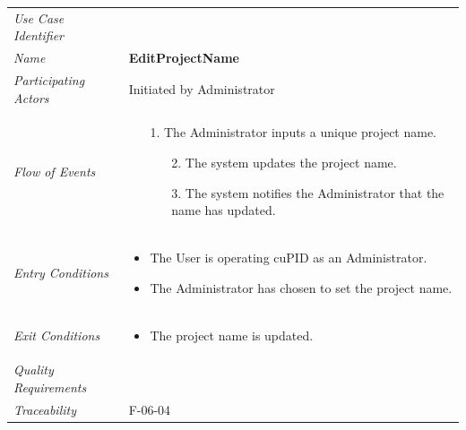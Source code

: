 \documentclass[12pt,letterpaper]{article}
\begin{document}
\begin{center}
	\begin{tabu} to 
		\toprule
		Use Case Identifier & \editprojectname{} \\
		Name & {\bf EditProjectName} \\
		Participating Actors & Initiated by Administrator \\
		Flow of Events & 
		\begin{minipage}[t]{\linewidth}
		    \begin{enumerate}
			    \item[1.] The Administrator inputs a unique project name.
			    \begin{enumerate}
			        \item[2.] The system updates the project name.
			        \item[3.] The system notifies the Administrator that the name has updated.
			    \end{enumerate}
			\end{enumerate}
		\end{minipage} \\

		Entry Conditions &
		\begin{minipage}[t]{\linewidth}
			\begin{itemize}
			    \item The User is operating cuPID as an Administrator.
			    \item The Administrator has chosen to set the project name.
	        \end{itemize}
		\end{minipage} \\

		Exit Conditions &
		\begin{minipage}[t]{\linewidth}
			\begin{itemize}
			    \item The project name is updated.
	        \end{itemize}
		\end{minipage} \\

		Quality Requirements & \\

		Traceability & F-06-04 \\
		\toprule
	\end{tabu}
\end{center}
\end{document}
